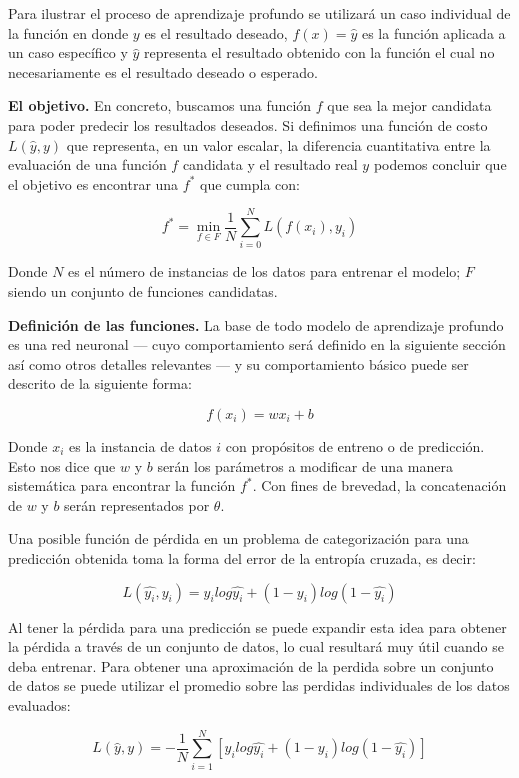 Para ilustrar el proceso de aprendizaje profundo se utilizará un caso individual de la función en donde $y$ es el resultado deseado, $f(x) = \hat{y}$ es la función aplicada a un caso específico y $\hat{y}$ representa el resultado obtenido con la función el cual no necesariamente es el resultado deseado o esperado.

\textbf{El objetivo.} En concreto, buscamos una función $f$ que sea la mejor candidata para poder predecir los resultados deseados. Si definimos una función de costo $L(\hat{y}, y)$ que representa, en un valor escalar, la diferencia cuantitativa entre la evaluación de una función $f$ candidata y el resultado real $y$ podemos concluir que el objetivo es encontrar una $f^*$ que cumpla con:

\[ f^* = \min_{f \in F} \frac{1}{N} \sum_{i = 0}^{N} L(f(x_i), y_i) \]

Donde $N$ es el número de instancias de los datos para entrenar el modelo; $F$ siendo un conjunto de funciones candidatas.

\textbf{Definición de las funciones.} La base de todo modelo de aprendizaje profundo es una red neuronal --- cuyo comportamiento será definido en la siguiente sección así como otros detalles relevantes --- y su comportamiento básico puede ser descrito de la siguiente forma:

\[ f(x_i) = w x_i + b \]

Donde $x_i$ es la instancia de datos $i$ con propósitos de entreno o de predicción. Esto nos dice que $w$ y $b$ serán los parámetros a modificar de una manera sistemática para encontrar la función $f^*$. Con fines de brevedad, la concatenación de $w$ y $b$ serán representados por $\theta$.

Una posible función de pérdida en un problema de categorización para una predicción obtenida toma la forma del error de la entropía cruzada, es decir:

\[ L(\hat{y_i}, y_i) = y_i log\hat{y_i} + (1 - y_i)log(1 - \hat{y_i}) \]

Al tener la pérdida para una predicción se puede expandir esta idea para obtener la pérdida a través de un conjunto de datos, lo cual resultará muy útil cuando se deba entrenar. Para obtener una aproximación de la perdida sobre un conjunto de datos se puede utilizar el promedio sobre las perdidas individuales de los datos evaluados:

\[ L(\hat{y}, y) = - \frac{1}{N} \sum_{i = 1}^{N} [y_i log\hat{y_i} + (1 - y_i)log(1 - \hat{y_i})] \]


